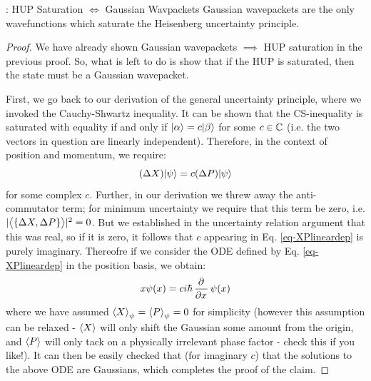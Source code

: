 \begin{propbox}{: HUP Saturation $\iff$ Gaussian Wavpackets}\label{prop-GaussianHUPsaturation}
    Gaussian wavepackets are the only wavefunctions which saturate the Heisenberg uncertainty principle.
\end{propbox}
\begin{proof}
    We have already shown Gaussian wavepackets $\implies$ HUP saturation in the previous proof. So, what is left to do is show that if the HUP is saturated, then the state must be a Gaussian wavepacket.

    First, we go back to our derivation of the general uncertainty principle, where we invoked the Cauchy-Shwartz inequality. It can be shown that the CS-inequality is saturated with equality if and only if $\lvert \alpha \rangle = c\lvert \beta \rangle$ for some $c \in \mathbb{C}$ (i.e. the two vectors in question are linearly independent). Therefore, in the context of position and momentum, we require:
    \begin{equation}\label{eq-XPlineardep}
        (\Delta X)\lvert \psi \rangle = c(\Delta P)\lvert \psi \rangle
    \end{equation}
    for some complex $c$. Further, in our derivation we threw away the anti-commutator term; for minimum uncertainty we require that this term be zero, i.e. $\lvert \left< \set{\Delta X, \Delta P} \right> \rvert^2 = 0$. But we established in the uncertainty relation argument that this was real, so if it is zero, it follows that $c$ appearing in Eq. \eqref{eq-XPlineardep} is purely imaginary. Thereofre if we consider the ODE defined by Eq. \eqref{eq-XPlineardep} in the position basis, we obtain:
    \begin{equation}
        x\psi(x) = ci\hbar\dpd{}{x}\psi(x)
    \end{equation}
    where we have assumed $\left< X \right>_\psi = \left< P \right>_\psi = 0$ for simplicity (however this assumption can be relaxed - $\left< X \right>$ will only shift the Gaussian some amount from the origin, and $\left< P \right>$ will only tack on a physically irrelevant phase factor - check this if you like!). It can then be easily checked that (for imaginary $c$) that the solutions to the above ODE are Gaussians, which completes the proof of the claim.
\end{proof}

